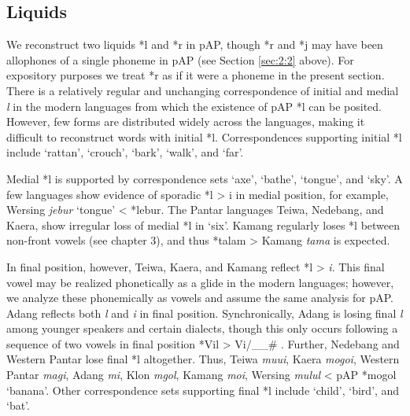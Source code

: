 \subsection{Liquids}
We reconstruct two liquids *l and *r in pAP, though *r and *j may have been allophones of a single phoneme in pAP (see Section \ref{sec:2:2} above). For expository purposes we treat *r as if it were a phoneme in the present section. There is a relatively regular and unchanging correspondence of initial and medial \textit{l} in the modern languages from which the existence of pAP *l can be posited. However, few forms are distributed widely across the languages, making it difficult to reconstruct words with initial *l. Correspondences supporting initial *l include `rattan', `crouch', `bark', `walk', and `far'. 

Medial *l is supported by correspondence sets `axe', `bathe', `tongue', and `sky'. A few languages show evidence of sporadic *l {\textgreater} i in medial position, for example, Wersing \textit{jebur }`tongue' {\textless} *lebur. The Pantar languages Teiwa, Nedebang, and Kaera, show irregular loss of medial *l in `six'. Kamang regularly loses *l between non-front vowels (see chapter 3), and thus *talam {\textgreater} Kamang \textit{ta{\textlengthmark}ma} is expected. 

In final position, however, Teiwa, Kaera, and Kamang reflect *l {\textgreater} \textit{i}. This final vowel may be realized phonetically as a glide in the modern languages; however, we analyze these phonemically as vowels and assume the same analysis for pAP. Adang reflects both \textit{l }and \textit{i} in final position. Synchronically, Adang is losing final \textit{l} among younger speakers and certain dialects, though this only occurs following a sequence of two vowels in final position *Vil {\textgreater} Vi/\_\_\# \citep{RobinsonEtAltaadang}. Further, Nedebang and Western Pantar lose final *l altogether. Thus, Teiwa \textit{mu{\pharfric}ui}, Kaera \textit{mogoi}, Western Pantar \textit{mag{\textlengthmark}i}, Adang \textit{m{\textopeno}}\textit{{\textglotstop}}\textit{{\textopeno}i}, Klon \textit{m{\textschwa}gol}, Kamang \textit{mo{\textlengthmark}i}, Wersing \textit{mulul }{\textless} pAP *mogol `banana'. Other correspondence sets supporting final *l include `child', `bird', and `bat'. 

